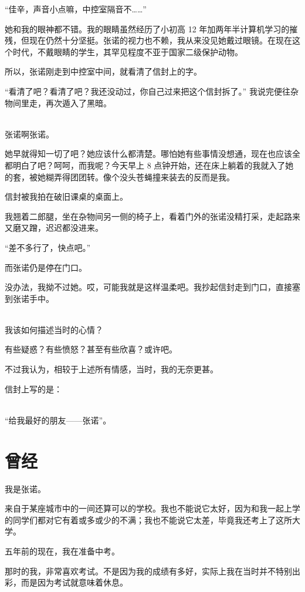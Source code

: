 \documentclass[UTF8]{ctexart}
\begin{document}
“佳辛，声音小点嘛，中控室隔音不……”

她和我的眼神都不错。我的眼睛虽然经历了小初高 12 年加两年半计算机学习的摧残，但现在仍然十分坚挺。张诺的视力也不赖，我从来没见她戴过眼镜。在现在这个时代，不戴眼睛的学生，其罕见程度不亚于国家二级保护动物。

所以，张诺刚走到中控室中间，就看清了信封上的字。

“看清了吧？看清了吧？我还没动过，你自己过来把这个信封拆了。” 我说完便往杂物间里走，再次遁入了黑暗。

~\\

张诺啊张诺。

她早就得知一切了吧？她应该什么都清楚。哪怕她有些事情没想通，现在也应该全都明白了吧？呵呵，而我呢？今天早上 8 点钟开始，还在床上躺着的我就入了她的套，被她糊弄得团团转。像个没头苍蝇撞来装去的反而是我。

信封被我拍在破旧课桌的桌面上。

我翘着二郎腿，坐在杂物间另一侧的椅子上，看着门外的张诺没精打采，走起路来又磨又蹭，迟迟都没进来。

“差不多行了，快点吧。”

而张诺仍是停在门口。

没办法，我拗不过她。哎，可能我就是这样温柔吧。我抄起信封走到门口，直接塞到张诺手中。

~\\

我该如何描述当时的心情？

有些疑惑？有些愤怒？甚至有些欣喜？或许吧。

不过我认为，相较于上述所有情感，当时，我的无奈更甚。

信封上写的是：

~\\

“给我最好的朋友——张诺”。

\section{曾经}

我是张诺。

来自于某座城市中的一间还算可以的学校。我也不能说它太好，因为和我一起上学的同学们都对它有着或多或少的不满；我也不能说它太差，毕竟我还考上了这所大学。

五年前的现在，我在准备中考。

那时的我，非常喜欢考试。不是因为我的成绩有多好，实际上我在当时并不特别出彩，而是因为考试就意味着休息。
\end{document}

